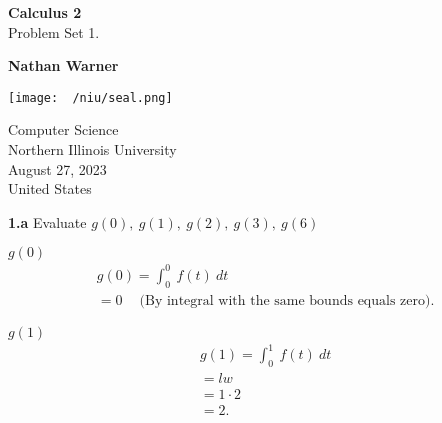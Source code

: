 \documentclass{report}
\title{\Huge{}}
\author{\huge{Nathan Warner}}
\date{\huge{}}
\begin{document}
        \begin{titlepage}
       \begin{center}
           \vspace*{1cm}
    
           \textbf{Calculus 2} \\
            Problem Set 1.
    
           \vspace{0.5cm}
            
                
           \vspace{1.5cm}
    
           \textbf{Nathan Warner}
    
           \vfill
                
                
           \vspace{0.8cm}
         
           \texttt{[image: ~/niu/seal.png]}
                
           Computer Science \\
           Northern Illinois University\\
           August 27, 2023 \\
           United States\\
           
                
       \end{center}
    \end{titlepage}
    \pagebreak \bigbreak \noindent
   \textbf{1.a} Evaluate $g(0),\ g(1),\ g(2),\ g(3),\ g(6)$ 
   \bigbreak \noindent 

   $g(0)$
   \begin{align*}
       &g(0) = \int_{0}^{0}\ f(t) \ dt \\
       &= 0\ \quad \text{(By integral with the same bounds equals zero)} 
   .\end{align*}
   \bigbreak \noindent 

   \textbf{$g(1)$}
   \begin{align*}
      &g(1) = \int_{0}^{1}\ f(t)\ dt \\ 
       &= lw  \\
       &= 1\cdot 2 \\
       &= 2
   .\end{align*}
   \bigbreak \noindent 
\end{document}
